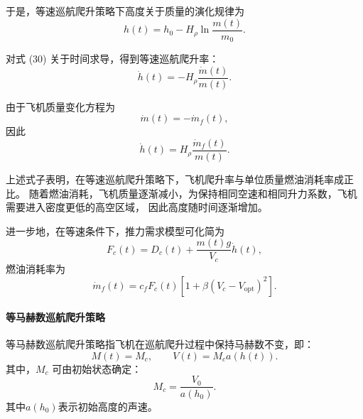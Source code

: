 \documentclass[withoutpreface,bwprint]{cumcmthesis} %
\begin{document}
于是，等速巡航爬升策略下高度关于质量的演化规律为
\begin{equation}
    h(t)
    =
    h_0
    -
    H_\rho
    \ln\frac{m(t)}{m_0}.
    \label{eq:constant_speed_h_t}
\end{equation}

对式 (30) 关于时间求导，得到等速巡航爬升率：
\begin{equation}
    \dot h(t)
    =
    -H_\rho\frac{\dot m(t)}{m(t)}.
    \label{eq:constant_speed_h_dot_1}
\end{equation}

由于飞机质量变化方程为
\begin{equation}
    \dot m(t)=-\dot m_f(t),
    \label{eq:m_dot_fuel}
\end{equation}
因此
\begin{equation}
    \dot h(t)
    =
    H_\rho
    \frac{\dot m_f(t)}{m(t)}.
    \label{eq:constant_speed_h_dot}
\end{equation}

上述式子表明，在等速巡航爬升策略下，飞机爬升率与单位质量燃油消耗率成正比。
随着燃油消耗，飞机质量逐渐减小，为保持相同空速和相同升力系数，飞机需要进入密度更低的高空区域，
因此高度随时间逐渐增加。

进一步地，在等速条件下，推力需求模型可化简为
\begin{equation}
    F_c(t)
    =
    D_c(t)
    +
    \frac{m(t)g}{V_c}\dot h(t),
    \label{eq:constant_speed_thrust}
\end{equation}
燃油消耗率为
\begin{equation}
    \dot m_f(t)
    =
    c_fF_c(t)
    \left[
    1+\beta\left(V_c-V_{\mathrm{opt}}\right)^2
    \right].
    \label{eq:constant_speed_fuel}
\end{equation}

\paragraph{等马赫数巡航爬升策略}

等马赫数巡航爬升策略指飞机在巡航爬升过程中保持马赫数不变，即：
\begin{equation}
    M(t)=M_c,
    \qquad
    V(t)=M_ca(h(t)).
    \label{eq:constant_mach_condition}
\end{equation}
其中，$M_c$ 可由初始状态确定：
\begin{equation}
    M_c=\frac{V_0}{a(h_0)}.
    \label{eq:Mc_initial}
\end{equation}
其中$a(h_0)$表示初始高度的声速。
\end{document}
